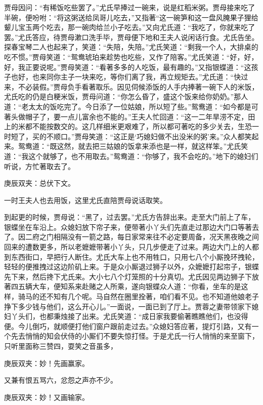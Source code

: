 \begin{parag}
    贾母因问：“有稀饭吃些罢了。”尤氏早捧过一碗来，说是红稻米粥。贾母接来吃了半碗，便吩咐：“将这粥送给凤哥儿吃去，”又指著“这一碗笋和这一盘风腌果子狸给颦儿宝玉两个吃去，那一碗肉给兰小子吃去。”又向尤氏道：“我吃了，你就来吃了罢。”尤氏答应，待贾母漱口洗手毕，贾母便下地和王夫人说闲话行食。尤氏告坐。探春宝琴二人也起来了，笑道：“失陪，失陪。”尤氏笑道：“剩我一个人，大排桌的吃不惯。”贾母笑道：“鸳鸯琥珀来趁势也吃些，又作了陪客。”尤氏笑道：“好，好，好，我正要说呢。”贾母笑道：“看著多多的人吃饭，最有趣的。”又指银蝶道：“这孩子也好，也来同你主子一块来吃，等你们离了我，再立规矩去。”尤氏道：“快过来，不必装假。”贾母负手看著取乐。因见伺候添饭的人手内捧著一碗下人的米饭，尤氏吃的仍是白粳米饭，贾母问道：“你怎么昏了，盛这个饭来给你奶奶。”那人道：“老太太的饭吃完了。今日添了一位姑娘，所以短了些。”鸳鸯道：“如今都是可著头做帽子了，要一点儿富余也不能的。”王夫人忙回道：“这一二年旱涝不定，田上的米都不能按数交的。这几样细米更艰难了，所以都可著吃的多少关去，生恐一时短了，买的不顺口。”贾母笑道：“这正是‘巧媳妇做不出没米的粥’来。”众人都笑起来。鸳鸯道：“既这然，就去把三姑娘的饭拿来添也是一样，就这样笨。”尤氏笑道：“我这个就够了，也不用取去。”鸳鸯道：“你够了，我不会吃的。”地下的媳妇们听说，方忙著取去了。\begin{note}庚辰双夹：总伏下文。\end{note}一时王夫人也去用饭，这里尤氏直陪贾母说话取笑。
\end{parag}


\begin{parag}
    到起更的时候，贾母说：“黑了，过去罢。”尤氏方告辞出来。走至大门前上了车，银蝶坐在车沿上。众媳妇放下帘子来，便带著小丫头们先直走过那边大门口等著去了。因二府之门相隔没有一箭之路，每日家常来往不必定要周备，况天黑夜晚之间回来的遭数更多，所以老嬷嬷带著小丫头，只几步便走了过来。两边大门上的人都到东西街口，早把行人断住。尤氏大车上也不用牲口，只用七八个小厮挽环拽轮，轻轻的便推拽过这边阶矶上来。于是众小厮退过狮子以外，众嬷嬷打起帘子，银蝶先下来，然后搀下尤氏来。大小七八个灯笼照的十分真切。尤氏因见两边狮子下放著四五辆大车，便知系来赴赌之人所乘，遂向银蝶众人道：“你看，坐车的是这样，骑马的还不知有几个呢。马自然在圈里拴著，咱们看不见。也不知道他娘老子挣下多少钱与他们，这么开心儿。”一面说，一面已到了厅上。贾蓉之妻带领家下媳妇丫头们，也都秉烛接了出来。尤氏笑道：“成日家我要偷著瞧瞧他们，也没得便。今儿倒巧，就顺便打他们窗户跟前走过去。”众媳妇答应著，提灯引路，又有一个先去悄悄的知会伏侍的小厮们不要失惊打怪。于是尤氏一行人悄悄的来至窗下，只听里面称三赞四，耍笑之音虽多，\begin{note}庚辰双夹：妙！先画赢家。\end{note}又兼有恨五骂六，忿怨之声亦不少。\begin{note}庚辰双夹：妙！又画输家。\end{note}
\end{parag}



